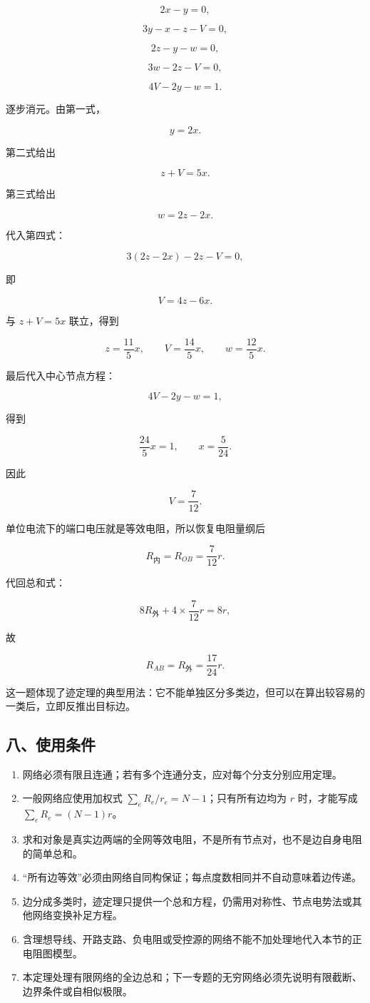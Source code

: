 \[
2x-y=0,
\]

\[
3y-x-z-V=0,
\]

\[
2z-y-w=0,
\]

\[
3w-2z-V=0,
\]

\[
4V-2y-w=1.
\]

逐步消元。由第一式，

\[
y=2x.
\]

第二式给出

\[
z+V=5x.
\]

第三式给出

\[
w=2z-2x.
\]

代入第四式：

\[
3(2z-2x)-2z-V=0,
\]

即

\[
V=4z-6x.
\]

与 \(z+V=5x\) 联立，得到

\[
z=\frac{11}{5}x,
\qquad
V=\frac{14}{5}x,
\qquad
w=\frac{12}{5}x.
\]

最后代入中心节点方程：

\[
4V-2y-w=1,
\]

得到

\[
\frac{24}{5}x=1,
\qquad
x=\frac5{24}.
\]

因此

\[
V=\frac{7}{12}.
\]

单位电流下的端口电压就是等效电阻，所以恢复电阻量纲后

\[
R_{\text{内}}=R_{OB}=\frac7{12}r.
\]

代回总和式：

\[
8R_{\text{外}}+4\times\frac7{12}r=8r,
\]

故

\[
\boxed{R_{AB}=R_{\text{外}}=\frac{17}{24}r}.
\]

这一题体现了迹定理的典型用法：它不能单独区分多类边，但可以在算出较容易的一类后，立即反推出目标边。

\subsection{八、使用条件}\label{m4:ux516bux4f7fux7528ux6761ux4ef6-2}

\begin{enumerate}
\def\labelenumi{\arabic{enumi}.}
\tightlist
\item
  网络必须有限且连通；若有多个连通分支，应对每个分支分别应用定理。
\item
  一般网络应使用加权式 \(\sum_eR_e/r_e=N-1\)；只有所有边均为 \(r\)
  时，才能写成 \(\sum_eR_e=(N-1)r\)。
\item
  求和对象是真实边两端的全网等效电阻，不是所有节点对，也不是边自身电阻的简单总和。
\item
  ``所有边等效''必须由网络自同构保证；每点度数相同并不自动意味着边传递。
\item
  边分成多类时，迹定理只提供一个总和方程，仍需用对称性、节点电势法或其他网络变换补足方程。
\item
  含理想导线、开路支路、负电阻或受控源的网络不能不加处理地代入本节的正电阻图模型。
\item
  本定理处理有限网络的全边总和；下一专题的无穷网络必须先说明有限截断、边界条件或自相似极限。
\end{enumerate}


